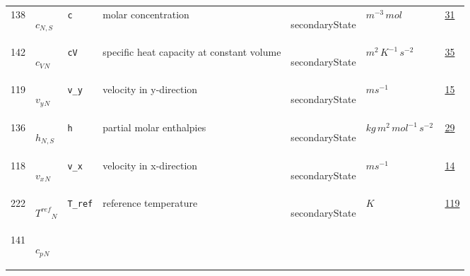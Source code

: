 \begin{longtable}{|p{1cm}|p{2.5cm}|p{4.5cm}|p{8cm}|p{3.0cm}|p{3cm}|p{1cm}|}
            138
             & \hypertarget{"v:138"}{ $ {c}{_{N, S}} $}
             & \verb|c|
             & molar concentration
             & \begin{lay}secondaryState \end{lay}
             & $ m^{-3} \,mol \, $
             &                 \hyperlink{"e:31"}{ 31 }
                 \\
            142
             & \hypertarget{"v:142"}{ $ {{c_V}}{_{N}} $}
             & \verb|cV|
             & specific heat capacity at constant volume
             & \begin{lay}secondaryState \end{lay}
             & $ m^{2} \,K^{-1} \,s^{-2} \, $
             &                 \hyperlink{"e:35"}{ 35 }
                 \\
            119
             & \hypertarget{"v:119"}{ $ {{v_y}}{_{N}} $}
             & \verb|v_y|
             & velocity in y-direction
             & \begin{lay}secondaryState \end{lay}
             & $ m s^{-1} \, $
             &                 \hyperlink{"e:15"}{ 15 }
                 \\
            136
             & \hypertarget{"v:136"}{ $ {h}{_{N, S}} $}
             & \verb|h|
             & partial molar enthalpies
             & \begin{lay}secondaryState \end{lay}
             & $ kg \,m^{2} \,mol^{-1} \,s^{-2} \, $
             &                 \hyperlink{"e:29"}{ 29 }
                 \\
            118
             & \hypertarget{"v:118"}{ $ {{v_x}}{_{N}} $}
             & \verb|v_x|
             & velocity in x-direction
             & \begin{lay}secondaryState \end{lay}
             & $ m s^{-1} \, $
             &                 \hyperlink{"e:14"}{ 14 }
                 \\
            222
             & \hypertarget{"v:222"}{ $ {{T^{ref}}}{_{N}} $}
             & \verb|T_ref|
             & reference temperature
             & \begin{lay}secondaryState \end{lay}
             & $ K \, $
             &                 \hyperlink{"e:119"}{ 119 }
                 \\
            141
             & \hypertarget{"v:141"}{ $ {{c_p}}{_{N}} $}

\end{longtable}

